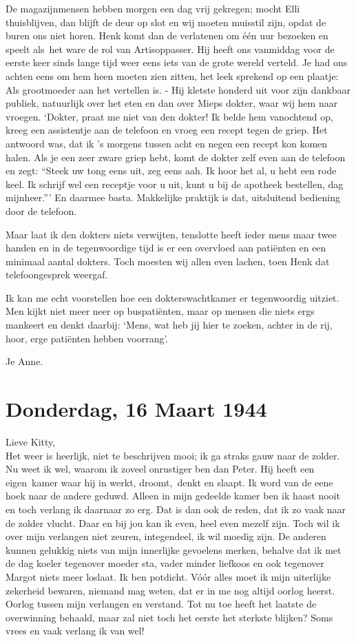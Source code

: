 \documentclass{book}
\begin{document}
De magazijnmensen hebben morgen een dag vrij gekregen; mocht Elli
thuisblijven, dan blijft de deur op slot en wij moeten muisstil zijn,
opdat de buren ons niet horen. Henk komt dan de verlatenen om één uur
bezoeken en speelt als~het ware de rol van Artisoppasser. Hij heeft ons
vanmiddag voor de eerste keer sinds lange tijd weer eens iets van de
grote wereld verteld. Je had ons achten eens om hem heen moeten zien
zitten, het leek sprekend op een plaatje: Als grootmoeder aan het
vertellen is. - Hij kletste honderd uit voor zijn dankbaar publiek,
natuurlijk over het eten en dan over Mieps dokter, waar wij hem naar
vroegen. `Dokter, praat me niet van den dokter! Ik belde hem vanochtend
op, kreeg een assistentje aan de telefoon en vroeg een recept tegen de
griep. Het antwoord was, dat ik 's morgens tussen acht en negen een
recept kon komen halen. Als je een zeer zware griep hebt, komt de dokter
zelf even aan de telefoon en zegt: ``Steek uw tong eens uit, zeg eens
aah. Ik hoor het al, u hebt een rode keel. Ik schrijf wel een receptje
voor u uit, kunt u bij de apotheek bestellen, dag mijnheer.''' En
daarmee basta. Makkelijke praktijk is dat, uitsluitend bediening door de
telefoon.

Maar laat ik den dokters niets verwijten, tenslotte heeft ieder mens
maar twee handen en in de tegenwoordige tijd is er een overvloed aan
patiënten en een minimaal aantal dokters. Toch moesten wij allen even
lachen, toen Henk dat telefoongesprek weergaf.

Ik kan me echt voorstellen hoe een dokterswachtkamer er tegenwoordig
uitziet. Men kijkt niet meer neer op buspatiënten, maar op mensen die
niets ergs mankeert en denkt daarbij: `Mens, wat heb jij hier te zoeken,
achter in de rij, hoor, erge patiënten hebben voorrang'.

Je Anne.

\chapter{Donderdag, 16 Maart 1944}

Lieve Kitty,\\Het weer is heerlijk, niet te beschrijven mooi; ik ga
straks gauw naar de zolder. Nu weet ik wel, waarom ik zoveel onrustiger
ben dan Peter. Hij heeft een eigen~kamer waar hij in werkt,
droomt,~denkt en slaapt. Ik word van de eene hoek naar de andere geduwd.
Alleen in mijn gedeelde kamer ben ik haast nooit en toch verlang ik
daarnaar zo erg. Dat is dan ook de reden, dat ik zo vaak naar de zolder
vlucht. Daar en bij jou kan ik even, heel even mezelf zijn. Toch wil ik
over mijn verlangen niet zeuren, integendeel, ik wil moedig zijn. De
anderen kunnen gelukkig niets van mijn innerlijke gevoelens merken,
behalve dat ik met de dag koeler tegenover moeder sta, vader minder
liefkoos en ook tegenover Margot niets meer loslaat. Ik ben potdicht.
Vóór alles moet ik mijn uiterlijke zekerheid bewaren, niemand mag weten,
dat er in me nog altijd oorlog heerst. Oorlog tussen mijn verlangen en
verstand. Tot nu toe heeft het laatste de overwinning behaald, maar zal
niet toch het eerste het sterkste blijken? Soms vrees en vaak verlang ik
van wel!
\end{document}
